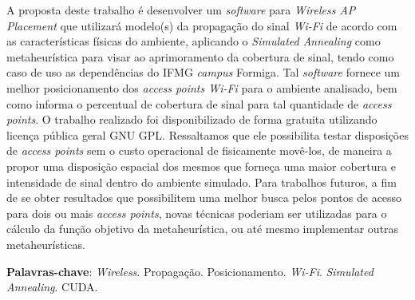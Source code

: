 \documentclass[
	12pt,				%
	twoside,			%
	a4paper,			%
	english,			%
	french,				%
	spanish,			%
	brazil				%
	]{abntex2}
\begin{document}
\setlength{\absparsep}{18pt} %
\begin{resumo}

  A proposta deste trabalho é desenvolver um \emph{software} para
  \emph{Wireless AP Placement} que utilizará modelo(s) da propagação do
  sinal \emph{Wi-Fi} de acordo com as características físicas do ambiente,
  aplicando o \emph{Simulated Annealing} como metaheurística para visar ao
  aprimoramento da cobertura de sinal, tendo como caso de uso as
  dependências do IFMG \emph{campus} Formiga. Tal \emph{software} fornece
  um melhor posicionamento dos \emph{access points Wi-Fi} para o ambiente
  analisado, bem como informa o percentual de cobertura de sinal para tal
  quantidade de \emph{access points}. O trabalho realizado foi
  disponibilizado de forma gratuita utilizando licença pública geral GNU
  GPL. Ressaltamos que ele possibilita testar disposições de \emph{access
  points} sem o custo operacional de fisicamente movê-los, de maneira a
  propor uma disposição espacial dos mesmos que forneça uma maior
  cobertura e intensidade de sinal dentro do ambiente simulado. Para
  trabalhos futuros, a fim de se obter resultados que possibilitem uma
  melhor busca pelos pontos de acesso para dois ou mais \emph{access
  points}, novas técnicas poderiam ser utilizadas para o cálculo da função
  objetivo da metaheurística, ou até mesmo implementar outras
  metaheurísticas.

 \textbf{Palavras-chave}: \emph{Wireless}. Propagação. Posicionamento. \emph{Wi-Fi}.
\emph{Simulated Annealing}. CUDA.
\end{resumo}


\end{document}
